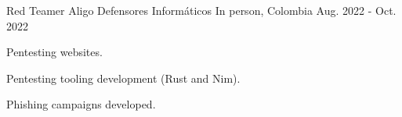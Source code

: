

\begin{cventries}

  \cventry
    {Red Teamer} %
    {Aligo Defensores Informáticos} %
    {In person, Colombia} %
    {Aug. 2022 - Oct. 2022} %
    {
      \begin{cvitems} %
        \item {Pentesting websites.}
        \item {Pentesting tooling development (Rust and Nim).}
        \item {Phishing campaigns developed.}
      \end{cvitems}
    }


\end{cventries}
